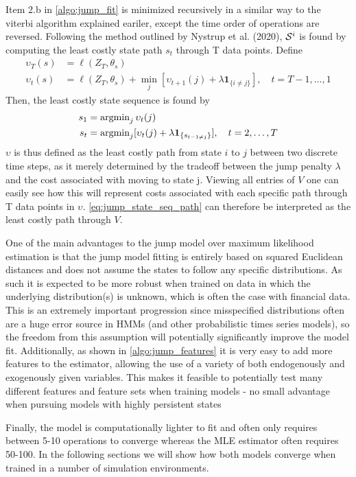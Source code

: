 Item 2.b in \cref{algo:jump_fit} is minimized recursively in a similar way to the viterbi algorithm explained eariler, except the time order of operations are reversed. Following the method outlined by Nystrup et al. (2020), $\S^i$ is found by computing the least costly state path $s_t$ through T data points. Define
\begin{align}
    \upsilon_T(s) &= \ell(Z_T, \theta_s) \\
    \upsilon_t(s) &= \ell(Z_T, \theta_s) + \min_j[\upsilon_{t+1}(j) + \lambda\mathbf{1}_{\{ i\ne j \}}],
    \quad t=T-1,\ldots,1
\label{eq:jump_cost_path}
\end{align}
Then, the least costly state sequence is found by
\begin{align}
    s_1 &= \argmin_j \upsilon_t(j) \\
    s_t &= \argmin_j[\upsilon_t(j) + \lambda\mathbf{1}_{\{ s_{t-1 \ne j} \}}], \quad t=2,\ldots,T
    \label{eq:jump_state_seq_path}
\end{align}
$\upsilon$ is thus defined as the least costly path from state $i$ to $j$ between two discrete time steps, as it merely determined by the tradeoff between the jump penalty $\lambda$ and the cost associated with moving to state j. Viewing all entries of $V$ one can easily see how this will represent costs associated with each specific path through T data points in $\upsilon$. \cref{eq:jump_state_seq_path} can therefore be interpreted as the least costly path through $V$. 

One of the main advantages to the jump model over maximum likelihood estimation is that the jump model fitting is entirely based on squared Euclidean distances and does not assume the states to follow any specific distributions. As such it is expected to be more robust when trained on data in which the underlying distribution(s) is unknown, which is often the case with financial data. This is an extremely important progression since misspecified distributions often are a huge error source in HMMs (and other probabilistic times series models), so the freedom from this assumption will potentially significantly improve the model fit. Additionally, as shown in \cref{algo:jump_features} it is very easy to add more features to the estimator, allowing the use of a variety of both endogenously and exogenously given variables. This makes it feasible to potentially test many different features and feature sets when training models - no small advantage when pursuing models with highly persistent states

Finally, the model is computationally lighter to fit and often only requires between 5-10 operations to converge whereas the MLE estimator often requires 50-100. In the following sections we will show how both models converge when trained in a number of simulation environments.